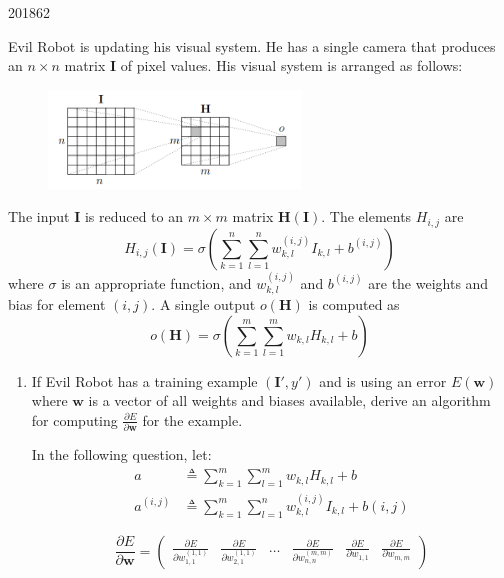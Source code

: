 \documentclass[10pt,\jkfside,a4paper]{article}
\begin{document}
\begin{examquestion}{2018}{6}{2}

Evil Robot is updating his visual system. He has a single camera that
produces an $n \times n$ matrix $\mathbf I$ of pixel values. His visual
system is arranged as follows:

\begin{figure}[H]
\centering
\includegraphics[width=0.6\textwidth]{2018robotvisual}
\end{figure}

The input $\mathbf I$ is reduced to an $m \times m$ matrix $\mathbf H
(\mathbf I)$. The elements $H_{i, j}$ are
\[
H_{i, j}(\mathbf I) = \sigma \left(
\sum^{n}_{k=1} \sum^{n}_{l=1} w^{(i, j)}_{k, l} I_{k, l} + b^{(i, j)}
\right)
\]
where $\sigma$ is an appropriate function, and $w^{(i, j)}_{k, l}$ and
$b^{(i, j)}$ are the weights and bias for element $(i, j)$. A single output
$o(\mathbf H)$ is computed as
\[
o(\mathbf H) = \sigma \left(
\sum^{m}_{k=1}
\sum^{m}_{l=1} w_{k, l} H_{k, l} + b
\right)
\]

\begin{enumerate}[label=(\alph*)]

\item If Evil Robot has a training example $(\mathbf I', y')$ and is using
an error $E(\mathbf w)$ where $\mathbf w$ is a vector of all weights and
biases available, derive an algorithm for computing $\frac{\partial
E}{\partial \mathbf w}$ for the example.

In the following question, let:
\begin{align}
a &\triangleq \sum^{m}_{k=1}\sum^{m}_{l=1} w_{k, l} H_{k, l} + b \\
a^{(i, j)} &\triangleq \sum^{m}_{k=1} \sum^{n}_{l=1} w^{(i, j)}_{k, l}
I_{k, l} + b{(i, j)}
\end{align}

\[
\frac{\partial E}{\partial \mathbf{w}}
=
\begin{pmatrix}
\frac{\partial E}{\partial w^{(1, 1)}_{1, 1}} &
\frac{\partial E}{\partial w^{(1, 1)}_{2, 1}} &
\dots &
\frac{\partial E}{\partial w^{(m, m)}_{n, n}} &
\frac{\partial E}{\partial w_{1, 1}} &
\frac{\partial E}{\partial w_{m, m}}
\end{pmatrix}
\]


\end{enumerate}
\end{examquestion}
\end{document}
